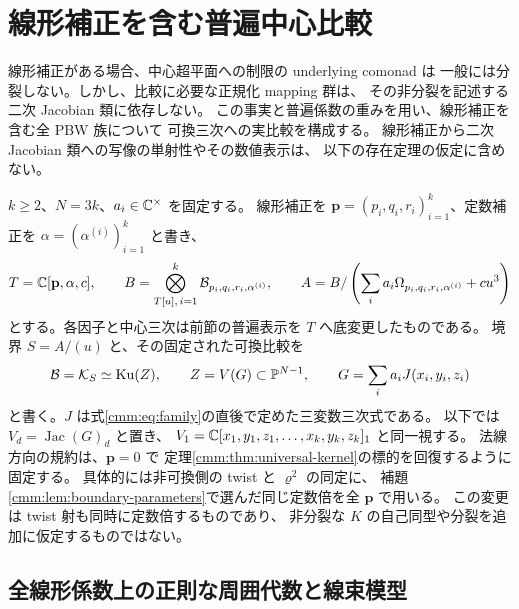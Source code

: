 \section{線形補正を含む普遍中心比較}
\label{lcc:sec:linear-comparison}

線形補正がある場合、中心超平面への制限の underlying comonad は
一般には分裂しない。しかし、比較に必要な正規化 mapping 群は、
その非分裂を記述する二次 Jacobian 類に依存しない。
この事実と普遍係数の重みを用い、線形補正を含む全 PBW 族について
可換三次への実比較を構成する。
線形補正から二次 Jacobian 類への写像の単射性やその数値表示は、
以下の存在定理の仮定に含めない。

$k\ge2$、$N=3k$、$a_i\in\mathbb C^\times$ を固定する。
線形補正を $\mathbf p=(p_i,q_i,r_i)_{i=1}^k$、定数補正を
$\alpha=(\alpha^{(i)})_{i=1}^k$ と書き、
\[
 T=\mathbb C[\mathbf p,\alpha,c],\qquad
 B=\bigotimes_{T[u],\,i=1}^k\mathcal B_{p_i,q_i,r_i,\alpha^{(i)}},
 \qquad
 A=B/\left(\sum_i a_i\Omega_{p_i,q_i,r_i,\alpha^{(i)}}+cu^3\right)
\]
とする。各因子と中心三次は前節の普遍表示を $T$ へ底変更したものである。
境界 $S=A/(u)$ と、その固定された可換比較を
\[
 \mathcal B=\mathcal K_S\simeq\operatorname{Ku}(Z),\qquad
 Z=V(G)\subset\mathbb P^{N-1},\qquad
 G=\sum_i a_iJ(x_i,y_i,z_i)
\]
と書く。$J$ は式\eqref{cmm:eq:family}の直後で定めた三変数三次式である。
以下では $V_d=\operatorname{Jac}(G)_d$ と置き、
$V_1=\mathbb C[x_1,y_1,z_1,\ldots,x_k,y_k,z_k]_1$ と同一視する。
法線方向の規約は、$\mathbf p=0$ で
定理\ref{cmm:thm:universal-kernel}の標的を回復するように固定する。
具体的には非可換側の twist と $\varrho^2$ の同定に、
補題\ref{cmm:lem:boundary-parameters}で選んだ同じ定数倍を全 $\mathbf p$ で用いる。
この変更は twist 射も同時に定数倍するものであり、
非分裂な $K$ の自己同型や分裂を追加に仮定するものではない。

\subsection{全線形係数上の正則な周囲代数と線束模型}


